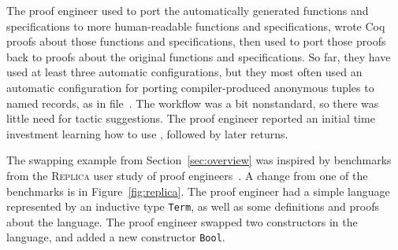 The proof engineer used \toolname to port the automatically generated functions and specifications to more
human-readable functions and specifications, wrote Coq proofs about those functions and specifications, then
used \toolname to port those proofs back to
proofs about the original functions and specifications.
So far, they have used at least three automatic configurations,
but they most often used an automatic configuration for porting compiler-produced anonymous tuples
to named records, as in file~\href{https://github.com/Ptival/saw-core-coq/tree/dump-wip}{}. %
The workflow was a bit nonstandard,
so there was little need for tactic suggestions.
The proof engineer reported an initial time investment learning how to use \toolname,
followed by later returns.

The swapping example from Section~\ref{sec:overview} was inspired by benchmarks 
from the \textsc{Replica} user study of proof engineers~\cite{replica}.
A change from one of the benchmarks is in Figure~\ref{fig:replica}.
The proof engineer had a simple language represented by an inductive type \lstinline{Term},
as well as some definitions and proofs about the language.
The proof engineer swapped two constructors in the language,
and added a new constructor \lstinline{Bool}.

